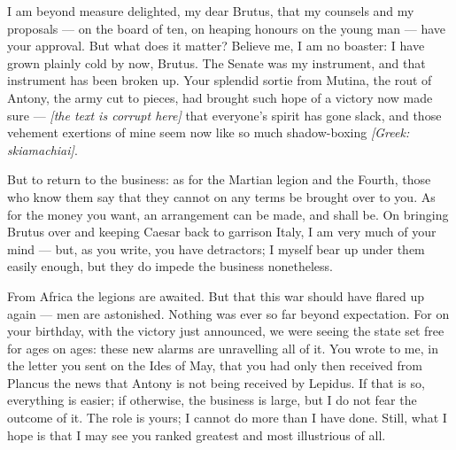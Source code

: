 

 I am beyond measure delighted, my dear Brutus, that my counsels and my proposals --- on the board of ten, on heaping honours on the young man --- have your approval. But what does it matter? Believe me, I am no boaster: I have grown plainly cold by now, Brutus. The Senate was my instrument, and that instrument has been broken up. Your splendid sortie from Mutina, the rout of Antony, the army cut to pieces, had brought such hope of a victory now made sure --- \textit{[the text is corrupt here]} that everyone's spirit has gone slack, and those vehement exertions of mine seem now like so much shadow-boxing \textit{[Greek: skiamachiai]}.

 But to return to the business: as for the Martian legion and the Fourth, those who know them say that they cannot on any terms be brought over to you. As for the money you want, an arrangement can be made, and shall be. On bringing Brutus over and keeping Caesar back to garrison Italy, I am very much of your mind --- but, as you write, you have detractors; I myself bear up under them easily enough, but they do impede the business nonetheless.

 From Africa the legions are awaited. But that this war should have flared up again --- men are astonished. Nothing was ever so far beyond expectation. For on your birthday, with the victory just announced, we were seeing the state set free for ages on ages: these new alarms are unravelling all of it. You wrote to me, in the letter you sent on the Ides of May, that you had only then received from Plancus the news that Antony is not being received by Lepidus. If that is so, everything is easier; if otherwise, the business is large, but I do not fear the outcome of it. The role is yours; I cannot do more than I have done. Still, what I hope is that I may see you ranked greatest and most illustrious of all.
